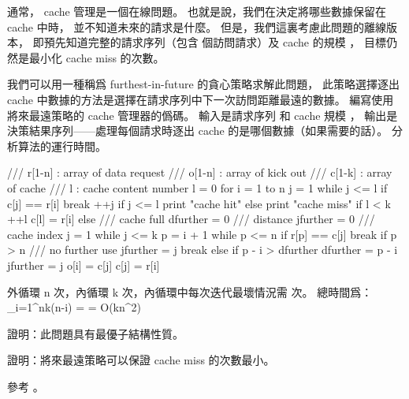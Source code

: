 通常， cache 管理是一個在線問題。
也就是說，我們在決定將哪些數據保留在 cache 中時，
並不知道未來的請求是什麼。
但是，我們這裏考慮此問題的離線版本，
即預先知道完整的請求序列（包含  個訪問請求）及 cache 的規模 ，
目標仍然是最小化 cache miss 的次數。

我們可以用一種稱爲 {\EMP furthest-in-future} 的貪心策略求解此問題，
此策略選擇逐出 cache 中數據的方法是選擇在請求序列中下一次訪問距離最遠的數據。
\startigBase[a]
\startitem
編寫使用將來最遠策略的 cache 管理器的僞碼。
輸入是請求序列  和 cache 規模 ，
輸出是決策結果序列——處理每個請求時逐出 cache 的是哪個數據（如果需要的話）。
分析算法的運行時間。
\stopitem

\startANSWER
{}
\startCLRS
/// r[1-n] : array of data request
/// o[1-n] : array of kick out
/// c[1-k] : array of cache
/// l : cache content number
l = 0
for i = 1 to n
	j = 1
	while j <= l
		if c[j] == r[i]
			break
		++j
	if j <= l
		print "cache hit"
	else
		print "cache miss"
		if l < k
			++l
			c[l] = r[i]
		else	/// cache full
			dfurther = 0	/// distance
			jfurther = 0	/// cache index
			j = 1
			while j <= k
				p = i + 1
				while p <= n
					if r[p] == c[j]
						break
				if p > n	/// no further use
					jfurther = j
					break
				else
					if p - i > dfurther
						dfurther = p - i
						jfurther = j
			o[i] = c[j]
			c[j] = r[i]
\stopCLRS

外循環 n 次，內循環 k 次，內循環中每次迭代最壞情況需  次。
總時間爲：
\startformula
\sum_{i=1}^{n}k(n-i) =  = O(kn^2)
\stopformula
\stopANSWER

\startitem
證明：此問題具有最優子結構性質。
\stopitem

\startANSWER
\TODO{}
\stopANSWER

\startitem
證明：將來最遠策略可以保證 cache miss 的次數最小。
\stopitem

\startANSWER
參考 \from[urlgreedyalgo]。
\stopANSWER
\stopigBase
\stopPROBLEM

\stopsubject%
